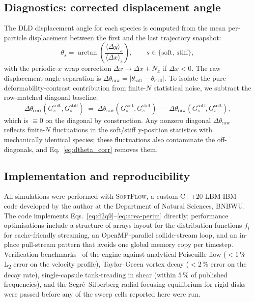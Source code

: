 \documentclass[11pt,a4paper]{article}
\begin{document}
\subsection{Diagnostics: corrected displacement angle}
\label{sec:methods-dtheta}

The DLD displacement angle for each species is computed from the
mean per-particle displacement between the first and the last
trajectory snapshot:
\begin{equation}
  \theta_{s} = \arctan\!\left(\frac{\langle \Delta y \rangle_s}
                                   {\langle \Delta x \rangle_s}\right),
   \qquad
   s \in \{\text{soft},\,\text{stiff}\},
   \label{eq:theta}
\end{equation}
with the periodic-$x$ wrap correction
$\Delta x \to \Delta x + N_x$ if $\Delta x < 0$. The raw
displacement-angle separation is
$\Delta\theta_{\text{raw}} = |\theta_{\text{soft}} -
 \theta_{\text{stiff}}|$. To isolate the pure
deformability-contrast contribution from finite-$N$ statistical
noise, we subtract the row-matched diagonal baseline:
\begin{equation}
  \Delta\theta_{\text{corr}}(G_s^{\text{soft}}, G_s^{\text{stiff}})
   \;=\;
   \Delta\theta_{\text{raw}}(G_s^{\text{soft}}, G_s^{\text{stiff}})
   \;-\;
   \Delta\theta_{\text{raw}}(G_s^{\text{soft}}, G_s^{\text{soft}}),
   \label{eq:dtheta_corr}
\end{equation}
which is $\equiv 0$ on the diagonal by construction. Any nonzero
diagonal $\Delta\theta_{\text{raw}}$ reflects finite-$N$
fluctuations in the soft/stiff y-position statistics with
mechanically identical species; these fluctuations also contaminate
the off-diagonals, and Eq.~\eqref{eq:dtheta_corr} removes them.

\subsection{Implementation and reproducibility}
\label{sec:methods-software}

All simulations were performed with \textsc{SoftFlow}, a
custom C++20 LBM-IBM code developed by the author at the
Department of Natural Sciences, BNBWU. The code implements
Eqs.~\eqref{eq:d2q9}--\eqref{eq:area-perim} directly; performance
optimisations include a structure-of-arrays layout for the
distribution functions $f_i$ for cache-friendly streaming, an
OpenMP-parallel collide-stream loop, and an in-place pull-stream
pattern that avoids one global memory copy per timestep.
Verification benchmarks~\citep{kruger2017lattice} of the engine
against analytical Poiseuille flow ($< 1\,\%$ L\textsubscript{2}
error on the velocity profile), Taylor--Green vortex decay
($< 2\,\%$ error on the decay rate), single-capsule tank-treading
in shear (within $5\,\%$ of published frequencies), and the
Segr\'e--Silberberg radial-focusing equilibrium for rigid disks
were passed before any of the sweep cells reported here were run.
\end{document}
